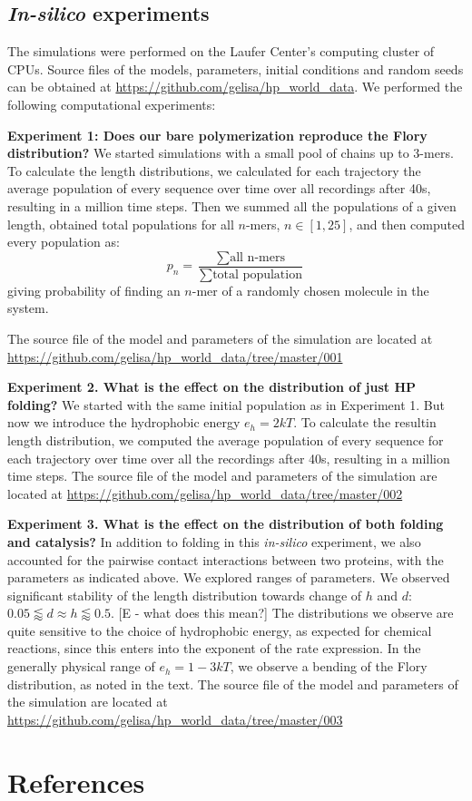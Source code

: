 \documentclass[5p,times]{elsarticle}
\begin{document}
\subsection{\textit{In-silico} experiments}\label{sec:experiments}
The simulations were performed on the Laufer Center's computing cluster of CPUs. 
Source files of the models, parameters, initial conditions and random seeds can be obtained at 
\url{https://github.com/gelisa/hp_world_data}.  We performed the following computational 
experiments:


\textbf{Experiment 1: Does our bare polymerization reproduce the Flory 
distribution?}\label{sec:expt1}
We started simulations with a small pool of chains up to 3-mers. To calculate the length 
distributions, 
we calculated for each trajectory the average population of every sequence over time over all 
recordings after 40s, resulting in a million time steps.  Then we summed all the populations of a 
given 
length, obtained total populations for all $n$-mers, $n\in[1,25]$, and then computed every 
population as:
\begin{equation}
 p_n = \frac{\sum\mbox{all n-mers}}{\sum\mbox{total population}}
\end{equation}
giving probability of finding an $n$-mer of a randomly chosen molecule in the system.

The source file of the model and parameters of the simulation are located at 
\url{https://github.com/gelisa/hp_world_data/tree/master/001}

\textbf{Experiment 2. What is the effect on the distribution of just HP folding?}
We started with the same initial population as in Experiment 1. But now we introduce the 
hydrophobic 
energy $e_h= 2kT$. To calculate the resultin length distribution, we computed the average 
population 
of every sequence for each trajectory over time over all the recordings after 40s, resulting in a 
million time steps. The source file of the model and parameters of the 
simulation are located at \url{https://github.com/gelisa/hp_world_data/tree/master/002}


\textbf{Experiment 3. What is the effect on the distribution of both folding and catalysis?}
In addition to folding in this \textit{in-silico} experiment, we also accounted for the pairwise 
contact interactions between two proteins, with the parameters as indicated above. We explored 
ranges of parameters.  We observed significant stability of the length distribution towards change 
of $h$ and $d$: $0.05\lessapprox d\approx h \lessapprox 0.5$. [E - what does this mean?]  The 
distributions we observe are quite sensitive to the choice of hydrophobic energy, as expected for 
chemical reactions, since this enters into the exponent of the rate expression. In the generally 
physical range of $e_h= 1-3 kT$, we observe a bending of the Flory distribution, as noted in the 
text. The source file of the model and parameters of the 
simulation are located at \url{https://github.com/gelisa/hp_world_data/tree/master/003}
 
\section*{References}

\end{document}
